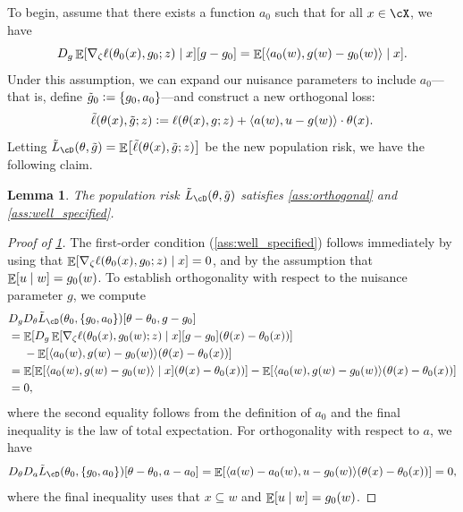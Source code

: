 \documentclass[11pt]{article} %
\newcommand{\pref}[1]{\cref{#1}}
\newcommand{\pfref}[1]{Proof of \pref{#1}}
\theoremstyle{theorem}  %
\newtheorem{lemma}{Lemma}
\theoremstyle{plain}
\DeclarePairedDelimiter{\brk}{[}{]}
\DeclarePairedDelimiter{\crl}{\{}{\}}
\DeclarePairedDelimiter{\tri}{\langle}{\rangle}
\DeclareMathOperator{\En}{\mathbb{E}}
\newcommand{\ls}{\ell}
\newcommand{\ldef}{\vcentcolon=}
\newcommand{\grad}{\nabla}
\newcommand{\gtone}{g_0}
\newcommand{\gttwo}{\theta_0}
\begin{document}
To begin, assume that there exists a function $a_0$ such that
for all $x\in\cX$, we have
\begin{equation}\label{eqn:correction}
D_{g}\En\brk*{\grad_{\zeta}\ls(\gttwo(x),\gtone;z)\mid{} x}[g - \gtone] = \En\brk*{\tri*{a_0(w),g(w) - \gtone(w)} \mid{} x}.
\end{equation}
Under this assumption, we can expand our nuisance parameters to
include $a_0$---that is, define $\tilde{g}_0\ldef\crl*{g_0,a_0}$---and construct a new orthogonal loss:
\begin{equation}
  \label{eq:orthogonalized_loss}
  \tilde{\ls}(\theta(x),\tilde{g};z) \ldef{} \ls(\theta(x),g;z) + \tri*{a(w),u-g(w)}\cdot{}\theta(x).
\end{equation}
%
%
%
%
%
%
%
%
%
Letting $\tilde{L}_{\cD}(\theta,\tilde{g})=\En\brk[\big]{\tilde{\ls}(\theta(x),\tilde{g};z)}$
be the new population risk, we have the following claim.
\begin{lemma}
  \label{lem:orthogonal_loss}
The population risk $\tilde{L}_{\cD}(\theta,\tilde{g})$ satisfies \pref{ass:orthogonal}
and \pref{ass:well_specified}.
\end{lemma}

\begin{proof}[\pfref{lem:orthogonal_loss}]
The first-order condition (\pref{ass:well_specified}) follows immediately by using that
$\En\brk*{\grad_{\zeta}\ls(\gttwo(x),\gtone;z)\mid{}x}=0$, and by the assumption that $\En\brk*{u\mid{}w}=g_0(w)$. To establish orthogonality with respect to the nuisance parameter $g$, we compute
\begin{align*}
  &D_{g}D_{\theta}\tilde{L}_{\cD}(\gttwo,\crl*{\gtone,a_0})[\theta-\theta_0,g-g_0]\\
  &=
\En\brk*{D_g\En\brk*{\grad_{\zeta}\ls(\gttwo(x),\gtone(w);z)\mid{}x}\brk{g-g_0}(\theta(x)-\theta_0(x))}\\
  &~~~~-\En\brk*{\tri*{a_0(w),g(w)-g_0(w)}(\theta(x)-\theta_0(x))}\\
    &=
    \En\brk*{\En\brk*{\tri*{a_0(w),g(w)-g_0(w)}\mid{}x}(\theta(x)-\theta_0(x))} - \En\brk*{\tri*{a_0(w),g(w)-g_0(w)}(\theta(x)-\theta_0(x))}\\
%
  &=0,
\end{align*}
where the second equality follows from the definition of $a_0$ and the final inequality is the law of total expectation. For
orthogonality with respect to $a$, we have
\begin{align*}
  D_{\theta}D_{a}\tilde{L}_{\cD}(\gttwo,\crl*{\gtone,a_0})[\theta-\theta_0,a-a_0]
  = \En\brk*{\tri*{a(w)-a_0(w),u-g_0(w)}(\theta(x)-\theta_0(x))}
  = 0,
\end{align*}
where the final inequality uses that $x\subseteq{}w$ and $\En\brk*{u\mid{}w}=g_0(w)$.
\end{proof}
\end{document}
